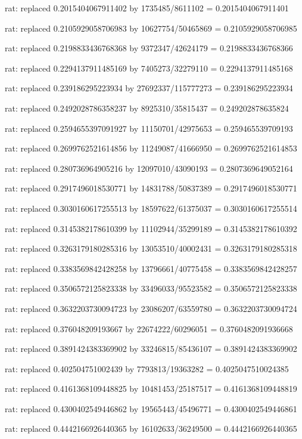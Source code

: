 \documentclass[a4paper,10pt]{article}
\begin{document}
\begin{eulernotebook}
\begin{eulercomment}
\begin{eulercomment}
\begin{eulercomment}
\begin{eulercomment}
\begin{eulercomment}
\begin{eulercomment}
\begin{eulercomment}
\begin{eulercomment}
\begin{eulercomment}
\begin{eulercomment}
\begin{eulercomment}
\begin{eulercomment}
\begin{eulercomment}
\begin{eulercomment}
\begin{eulercomment}
\begin{eulercomment}
\begin{euleroutput}
  rat: replaced 0.2015404067911402 by 1735485/8611102 = 0.2015404067911401
  
  rat: replaced 0.2105929058706983 by 10627754/50465869 = 0.2105929058706985
  
  rat: replaced 0.2198833436768368 by 9372347/42624179 = 0.2198833436768366
  
  rat: replaced 0.2294137911485169 by 7405273/32279110 = 0.2294137911485168
  
  rat: replaced 0.239186295223934 by 27692337/115777273 = 0.239186295223934
  
  rat: replaced 0.2492028786358237 by 8925310/35815437 = 0.249202878635824
  
  rat: replaced 0.2594655397091927 by 11150701/42975653 = 0.259465539709193
  
  rat: replaced 0.2699762521614856 by 11249087/41666950 = 0.2699762521614853
  
  rat: replaced 0.280736964905216 by 12097010/43090193 = 0.2807369649052164
  
  rat: replaced 0.2917496018530771 by 14831788/50837389 = 0.2917496018530771
  
  rat: replaced 0.3030160617255513 by 18597622/61375037 = 0.3030160617255514
  
  rat: replaced 0.3145382178610399 by 11102944/35299189 = 0.3145382178610392
  
  rat: replaced 0.3263179180285316 by 13053510/40002431 = 0.3263179180285318
  
  rat: replaced 0.3383569842428258 by 13796661/40775458 = 0.3383569842428257
  
  rat: replaced 0.3506572125823338 by 33496033/95523582 = 0.3506572125823338
  
  rat: replaced 0.3632203730094723 by 23086207/63559780 = 0.3632203730094724
  
  rat: replaced 0.376048209193667 by 22674222/60296051 = 0.3760482091936668
  
  rat: replaced 0.3891424383369902 by 33246815/85436107 = 0.3891424383369902
  
  rat: replaced 0.402504751002439 by 7793813/19363282 = 0.4025047510024385
  
  rat: replaced 0.4161368109448825 by 10481453/25187517 = 0.4161368109448819
  
  rat: replaced 0.4300402549446862 by 19565443/45496771 = 0.4300402549446861
  
  rat: replaced 0.4442166926440365 by 16102633/36249500 = 0.4442166926440365
  

\end{euleroutput}
\end{eulercomment}
\end{eulercomment}
\end{eulercomment}
\end{eulercomment}
\end{eulercomment}
\end{eulercomment}
\end{eulercomment}
\end{eulercomment}
\end{eulercomment}
\end{eulercomment}
\end{eulercomment}
\end{eulercomment}
\end{eulercomment}
\end{eulercomment}
\end{eulercomment}
\end{eulercomment}
\end{eulernotebook}
\end{document}
